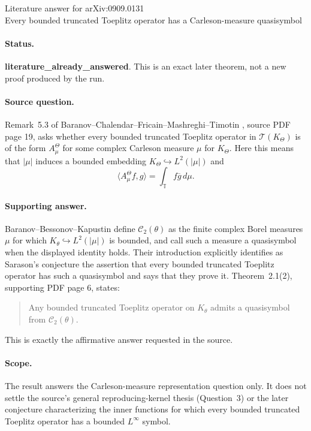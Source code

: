 \documentclass[11pt]{article}
\begin{document}
\begin{center}
{\Large Literature answer for arXiv:0909.0131}\\[4pt]
{\large Every bounded truncated Toeplitz operator has a
Carleson-measure quasisymbol}
\end{center}

\paragraph{Status.}
\textbf{literature\_already\_answered}.  This is an exact later theorem,
not a new proof produced by the run.

\paragraph{Source question.}
Remark~5.3 of Baranov--Chalendar--Fricain--Mashreghi--Timotin
\cite{BCFMT}, source PDF page 19, asks whether every bounded truncated
Toeplitz operator in $\mathcal T(K_\Theta)$ is of the form
$A_\mu^\Theta$ for some complex Carleson measure $\mu$ for $K_\Theta$.
Here this means that $|\mu|$ induces a bounded embedding
$K_\Theta\hookrightarrow L^2(|\mu|)$ and
\[
 \langle A_\mu^\Theta f,g\rangle=\int_{\mathbb T}f\overline g\,d\mu.
\]

\paragraph{Supporting answer.}
Baranov--Bessonov--Kapustin \cite{BBK} define $\mathcal C_2(\theta)$ as
the finite complex Borel measures $\mu$ for which
$K_\theta\hookrightarrow L^2(|\mu|)$ is bounded, and call such a measure a
quasisymbol when the displayed identity holds.  Their introduction
explicitly identifies as Sarason's conjecture the assertion that every
bounded truncated Toeplitz operator has such a quasisymbol and says that they
prove it.  Theorem~2.1(2), supporting PDF page 6, states:
\begin{quote}
Any bounded truncated Toeplitz operator on $K_\theta$ admits a quasisymbol
from $\mathcal C_2(\theta)$.
\end{quote}
This is exactly the affirmative answer requested in the source.

\paragraph{Scope.}
The result answers the Carleson-measure representation question only.  It
does not settle the source's general reproducing-kernel thesis (Question~3)
or the later conjecture characterizing the inner functions for which every
bounded truncated Toeplitz operator has a bounded $L^\infty$ symbol.
\end{document}
